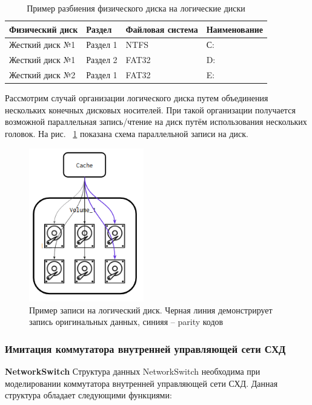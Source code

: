 \begin{table}[]
\centering
\caption{Пример разбиения физического диска на логические диски}
\label{tab:volumetable}
\begin{tabularx}{\textwidth}{|l|l|l|l|}
\hline
Физический диск & Раздел   & Файловая система & Наименование \\ \hline
Жесткий диск №1 & Раздел 1 & NTFS             & С:           \\ \hline
Жесткий диск №1 & Раздел 2 & FAT32            & D:           \\ \hline
Жесткий диск №2 & Раздел 1 & FAT32            & E:           \\ \hline
\end{tabularx}
\end{table}

\par 
Рассмотрим случай организации логического диска путем объединения нескольких конечных дисковых носителей. При такой организации получается возможной параллельная запись/чтение на диск путём использования нескольких головок. На рис. ~\ref{fig:volume} показана схема параллельной записи на диск. 
\begin{figure}[!ht]
\centering
\includegraphics[width=5cm]{Kenenbek/images/volume.png}
\caption{Пример записи на логический диск. Черная линия демонстрирует запись оригинальных данных, синияя -- parity кодов}
\label{fig:volume}
\end{figure}


\subsubsection{Имитация коммутатора внутренней управляющей сети СХД}
\textbf{NetworkSwitch}
Структура данных NetworkSwitch необходима при моделировании коммутатора внутренней управляющей сети СХД. Данная структура обладает следующими функциями:

